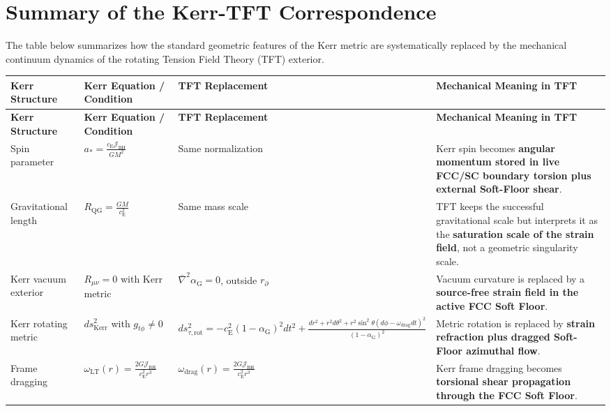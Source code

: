 \section{Summary of the Kerr-TFT Correspondence}

The table below summarizes how the standard geometric features of the Kerr metric are systematically replaced by the mechanical continuum dynamics of the rotating Tension Field Theory (TFT) exterior.

\vspace{0.5cm}
\noindent
\renewcommand{\arraystretch}{1.6}
\begin{longtable}{@{} p{3cm} p{4.5cm} p{4.5cm} p{4cm} @{}}
\toprule
\textbf{Kerr Structure} & \textbf{Kerr Equation / Condition} & \textbf{TFT Replacement} & \textbf{Mechanical Meaning in TFT} \\
\midrule
\endfirsthead

\toprule
\textbf{Kerr Structure} & \textbf{Kerr Equation / Condition} & \textbf{TFT Replacement} & \textbf{Mechanical Meaning in TFT} \\
\midrule
\endhead

Spin parameter & $a_\ast = \frac{c_{\mathrm{E}}\mathcal{J}_{\mathrm{BH}}}{GM^2}$ & Same normalization & Kerr spin becomes \textbf{angular momentum stored in live FCC/SC boundary torsion plus external Soft-Floor shear}. \\

Gravitational length & $R_{\mathrm{QG}} = \frac{GM}{c_{\mathrm{E}}^2}$ & Same mass scale & TFT keeps the successful gravitational scale but interprets it as the \textbf{saturation scale of the strain field}, not a geometric singularity scale. \\

Kerr vacuum exterior & $R_{\mu\nu}=0$ with Kerr metric & $\bar{\nabla}^2\alpha_{\mathrm{G}}=0$, outside $r_{\partial}$ & Vacuum curvature is replaced by a \textbf{source-free strain field in the active FCC Soft Floor}. \\

Kerr rotating metric & $ds^2_{\mathrm{Kerr}}$ with $g_{t\phi} \neq 0$ & $ds^2_{\tau,\mathrm{rot}} = -c_{\mathrm{E}}^2(1-\alpha_{\mathrm{G}})^2 dt^2 + \frac{dr^2 + r^2 d\theta^2 + r^2 \sin^2\theta (d\phi - \omega_{\mathrm{drag}} dt)^2}{(1-\alpha_{\mathrm{G}})^2}$ & Metric rotation is replaced by \textbf{strain refraction plus dragged Soft-Floor azimuthal flow}. \\

Frame dragging & $\omega_{\mathrm{LT}}(r) = \frac{2G\mathcal{J}_{\mathrm{BH}}}{c_{\mathrm{E}}^2 r^3}$ & $\omega_{\mathrm{drag}}(r) = \frac{2G\mathcal{J}_{\mathrm{BH}}}{c_{\mathrm{E}}^2 r^3}$ & Kerr frame dragging becomes \textbf{torsional shear propagation through the FCC Soft Floor}. \\


\end{longtable}
